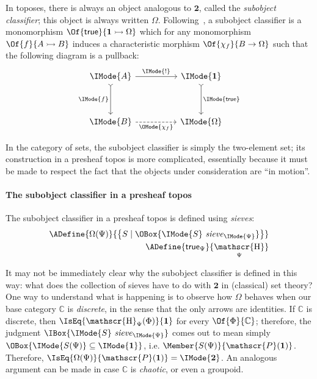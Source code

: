 \documentclass{article}
\DeclareMathOperator\OpYoneda{\mathscr{H}}
\newcommand\Yoneda[1]{\OpYoneda_{#1}}
\newcommand\IsSubsetEq[2]{\IMode{#1}\subseteq\IMode{#2}}
\newcommand\One{\mathbf{1}}
\newcommand\Two{\mathbf{2}}
\newcommand\IsSieve[2]{\IMode{#2}\ \mathit{sieve}_{\IMode{#1}}}
\begin{document}
\newcommand\Mono[2]{#1\rightarrowtail{#2}}
\newcommand\True{\mathsf{true}}

In toposes, there is always an object analogous to $\Two$, called the
\emph{subobject classifier}; this object is always written
$\Omega$. Following~\cite{maclane-moerdijk:1992}, a subobject
classifier is a monomorphism $\Of{\True}{\Mono{\One}{\Omega}}$ which for any
monomorphism $\Of{f}{\Mono{A}{B}}$ induces a characteristic morphism
$\Of{\chi_f}{B\to\Omega}$ such that the following diagram is a
pullback:
\[
  \begin{tikzcd}[sep=huge]
    \IMode{A}
    \arrow[r,"\IMode{!}"]
    \arrow[d, swap, rightarrowtail, "\IMode{f}"]
    &
    \IMode{\One}
    \arrow[d, rightarrowtail,"\IMode{\True}"]
    \\
    \IMode{B}
    \arrow[r, dashed, swap, "\OMode{\chi_f}"]
    &
    \IMode{\Omega}
  \end{tikzcd}
\]

In the category of sets, the subobject classifier is simply the
two-element set; its construction in a presheaf topos is more
complicated, essentially because it must be made to respect the fact
that the objects under consideration are ``in motion''.

\newcommand\MkSet[1]{\left\{#1\right\}}
\newcommand\Pow[1]{\mathscr{P} (#1)}
\newcommand\Dom[1]{\vert{#1}\vert}

\paragraph{The subobject classifier in a presheaf topos}

The subobject classifier in a presheaf topos is defined using
\emph{sieves}:
\begin{align*}
  \ADefine{
    \Omega(\Psi)
  }{
    \MkSet{
      S \mid \OBox{\IsSieve{\Psi}{S}}
    }
  }
  \\
  \ADefine{
    \True_\Psi
  }{
    \Yoneda{\Psi}
  }
\end{align*}

\begin{remark}
  It may not be immediately clear why the subobject classifier is
  defined in this way: what does the collection of sieves have to do
  with $\Two$ in (classical) set theory? One way to understand what is
  happening is to observe how $\Omega$ behaves when our base category
  $\mathbb{C}$ is \emph{discrete}, in the sense that the only arrows
  are identities.
%
  If $\mathbb{C}$ is discrete, then $\IsEq{\Yoneda{\Psi}(\Phi)}{\One}$
  for every $\Of{\Phi}{\mathbb{C}}$; therefore, the judgment
  $\IBox{\IsSieve{\Psi}{S}}$ comes out to mean simply
  $\OBox{\IsSubsetEq{S(\Psi)}{\One}}$,
  i.e. $\Member{S(\Psi)}{\Pow{\One}}$. Therefore,
  $\IsEq{\Omega(\Psi)}{\Pow{\One}}=\IMode{\Two}$. An analogous
  argument can be made in case $\mathbb{C}$ is \emph{chaotic}, or even
  a groupoid.
\end{remark}
\end{document}
